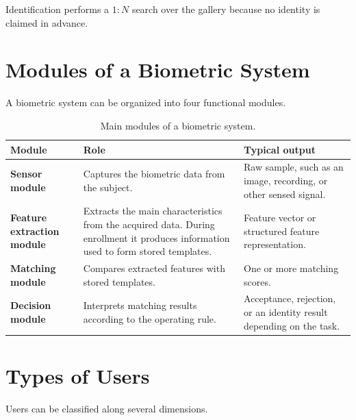 \documentclass[11pt,a4paper,oneside]{report}
\begin{document}
Identification performs a \(1{:}N\) search over the gallery because no
identity is claimed in advance.

\section{Modules of a Biometric System}
\label{subsec:modules}

A biometric system can be organized into four functional modules.

\begin{table}[htbp]
\centering
\caption{Main modules of a biometric system.}
\label{tab:modules}
\small

\begin{tabular}{
    >{\bfseries}P{3.0cm}
    P{5.25cm}
    P{5.25cm}
}
\toprule

Module &
\textbf{Role} &
\textbf{Typical output}
\\

\midrule

Sensor module &
Captures the biometric data from the subject. &
Raw sample, such as an image, recording, or other sensed signal.
\\

Feature extraction module &
Extracts the main characteristics from the acquired data.
During enrollment it produces information used to form stored templates. &
Feature vector or structured feature representation.
\\

Matching module &
Compares extracted features with stored templates. &
One or more matching scores.
\\

Decision module &
Interprets matching results according to the operating rule. &
Acceptance, rejection, or an identity result depending on the task.
\\

\bottomrule
\end{tabular}

\end{table}

\section{Types of Users}
\label{subsec:user-types}

Users can be classified along several dimensions.
\end{document}
